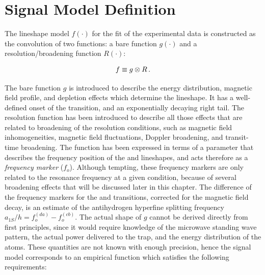 \section{Signal Model Definition}


The lineshape model $f(\cdot)$ for the fit of the experimental data is constructed as the convolution of two functions: a bare function $g(\cdot)$ and a resolution/broadening function $R(\cdot)$:

\begin{equation}
\centering
f \equiv g \otimes R \,.
\label{eq:conv}
\end{equation}

The bare function $g$ is introduced to describe the energy distribution, magnetic field profile, and depletion effects which determine the lineshape. It has a well-defined onset of the transition, and an exponentially decaying right tail. The resolution function has been introduced to describe all those effects that are related to broadening of the resolution conditions, such as magnetic field inhomogeneities, magnetic field fluctuations, Doppler broadening, and transit-time broadening.
The function has been expressed in terms of a parameter that describes the frequency position of the \cb and \da lineshapes, and acts therefore as a \textit{frequency marker} ($f_o$). Although tempting, these frequency markers are only related to the resonance frequency at a given condition, because of several broadening effects that will be discussed later in this chapter. The difference of the frequency markers for the \cb and \da transitions, corrected for the magnetic field decay, is an estimate of the antihydrogen hyperfine splitting frequency $a_{1S}/h = f_o^{(da)} - f_o^{(cb)}$. 
The actual shape of $g$ cannot be derived directly from first principles, since it would require knowledge of the microwave standing wave pattern, the actual power delivered to the trap, and the energy distribution of the atoms. These quantities are not known with enough precision, hence the signal model corresponds to an empirical function which satisfies the following requirements:

